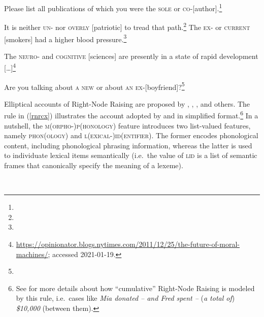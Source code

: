 \eal
\label{rnrex2}
\ex Please list all publications of which you were the \textsc{sole} or
\textsc{co}-[author].\footnote{}
 
\ex  It is neither \textsc{un}- nor \textsc{overly} [patriotic] to tread that path.\footnote{} 
\ex The \textsc{ex-} or \textsc{current} [smokers] had a higher blood pressure.\footnote{} 

\ex The \textsc{neuro}- and \textsc{cognitive} [sciences] are
presently in a state of rapid development
[\ldots]\footnote{\url{https://opinionator.blogs.nytimes.com/2011/12/25/the-future-of-moral-machines/};
  accessed 2021-01-19.}

\ex Are you talking about \textsc{a new}  or about \textsc{an ex}-[boyfriend]?\footnote{}

\zl


Elliptical accounts of Right-Node Raising are proposed by \citet{Beavers},
\citet{Yatabe:04}, \citet{chavesrnr}, and others. The rule in (\ref{rnrcx}) illustrates the account adopted by 
 \citet[874]{chavesrnr}  and \citet*[]{aoi}
  in simplified format.\footnote{See \citet{chavesrnr} for more details about how ``cumulative'' Right-Node Raising is modeled by this rule, i.e.\
 cases like \emph{Mia donated -- and Fred spent --} (\emph{a total of}) \emph{\$10,000} (between them).
}
In a nutshell, the \textsc{m(orpho-)p(honology)} feature introduces two list-valued features, namely \textsc{phon}(\textsc{ology}) and \textsc{l(exical-)id(entifier)}. The former encodes phonological content, including phonological phrasing information,  whereas the latter is used to individuate lexical items semantically (i.e.\  the value
of \textsc{lid} is a list of semantic frames that canonically specify the meaning of a lexeme).
 
\eas
\label{rnrcx}
 \impl\\
\zs

